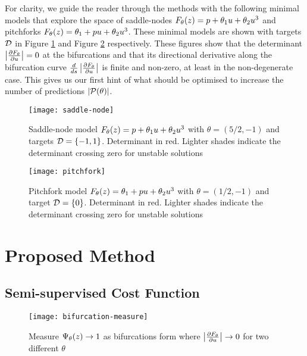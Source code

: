 For clarity, we guide the reader through the methods with the following minimal models that explore the space of saddle-nodes $F_{\theta}(z) = p + \theta_{1}u+\theta_{2}u^3$ and pitchforks $F_{\theta}(z) = \theta_{1} + p u+\theta_{2}u^3$. These minimal models are shown with targets $\mathcal{D}$ in Figure \ref{fig:saddle-node} and Figure \ref{fig:pitchfork} respectively. These figures show that the determinant $\left| \frac{\partial F_{\theta}}{\partial u} \right|=0$ at the bifurcations and that its directional derivative along the bifurcation curve $\frac{d}{ds}\left| \frac{\partial F_{\theta}}{\partial u} \right|$ is finite and non-zero, at least in the non-degenerate case. This gives us our first hint of what should be optimised to increase the number of predictions $|\mathcal{P}(\theta)|$.

\begin{figure}
\centering
\texttt{[image: saddle-node]}
\caption{Saddle-node model $F_{\theta}(z) = p + \theta_{1}u+\theta_{2}u^3$ with $\theta=(5/2,-1)$ and targets $\mathcal{D}=\{-1,1\}$. Determinant in red. Lighter shades indicate the determinant crossing zero for unstable solutions}
\label{fig:saddle-node}
\end{figure}

\begin{figure}
\centering
\texttt{[image: pitchfork]}
\caption{Pitchfork model $F_{\theta}(z) = \theta_{1} + p u+\theta_{2}u^3$ with $\theta=(1/2,-1)$ and target $\mathcal{D}=\{0\}$. Determinant in red. Lighter shades indicate the determinant crossing zero for unstable solutions}
\label{fig:pitchfork}
\end{figure}

\section{Proposed Method}
\subsection{Semi-supervised Cost Function}

\begin{figure}
    \centering
    \texttt{[image: bifurcation-measure]}
    \caption{Measure $\Psi_{\theta}(z)\rightarrow 1$ as bifurcations form where $\left| \frac{\partial F_{\theta}}{\partial u} \right|\rightarrow0$ for two different $\theta$}
    \label{fig:bifurcation-measure}
\end{figure}


